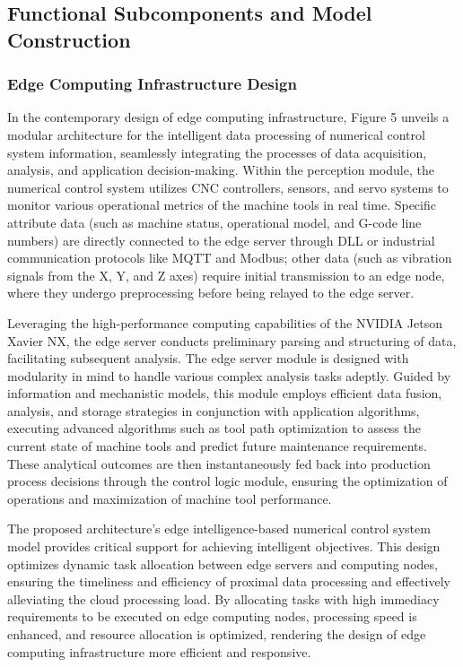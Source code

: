 \documentclass[preprint,12pt,authoryear]{elsarticle}
\begin{document}
\subsection{Functional Subcomponents and Model Construction}

\subsubsection{Edge Computing Infrastructure Design}

In the contemporary design of edge computing infrastructure, Figure 5 unveils a modular architecture for the intelligent data processing of numerical control system information, seamlessly integrating the processes of data acquisition, analysis, and application decision-making. Within the perception module, the numerical control system utilizes CNC controllers, sensors, and servo systems to monitor various operational metrics of the machine tools in real time. Specific attribute data (such as machine status, operational model, and G-code line numbers) are directly connected to the edge server through DLL or industrial communication protocols like MQTT and Modbus; other data (such as vibration signals from the X, Y, and Z axes) require initial transmission to an edge node, where they undergo preprocessing before being relayed to the edge server.

Leveraging the high-performance computing capabilities of the NVIDIA Jetson Xavier NX, the edge server conducts preliminary parsing and structuring of data, facilitating subsequent analysis. The edge server module is designed with modularity in mind to handle various complex analysis tasks adeptly. Guided by information and mechanistic models, this module employs efficient data fusion, analysis, and storage strategies in conjunction with application algorithms, executing advanced algorithms such as tool path optimization to assess the current state of machine tools and predict future maintenance requirements. These analytical outcomes are then instantaneously fed back into production process decisions through the control logic module, ensuring the optimization of operations and maximization of machine tool performance.

The proposed architecture's edge intelligence-based numerical control system model provides critical support for achieving intelligent objectives. This design optimizes dynamic task allocation between edge servers and computing nodes, ensuring the timeliness and efficiency of proximal data processing and effectively alleviating the cloud processing load. By allocating tasks with high immediacy requirements to be executed on edge computing nodes, processing speed is enhanced, and resource allocation is optimized, rendering the design of edge computing infrastructure more efficient and responsive.
\end{document}
